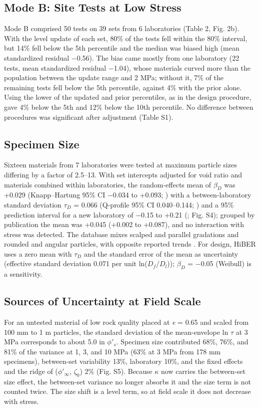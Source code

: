 \documentclass[Journal,letterpaper]{ascelike-new}
\begin{document}
\subsection{Mode B: Site Tests at Low Stress}
Mode B comprised 50 tests on 39 sets from 6 laboratories (Table 2, Fig. 2b). With the level update of each set, 80\% of the tests fell within the 80\% interval, but 14\% fell below the 5th percentile and the median was biased high (mean standardized residual $-$0.56). The bias came mostly from one laboratory (22 tests, mean standardized residual $-$1.04), whose materials curved more than the population between the update range and 2 MPa; without it, 7\% of the remaining tests fell below the 5th percentile, against 4\% with the prior alone. Using the lower of the updated and prior percentiles, as in the design procedure, gave 4\% below the 5th and 12\% below the 10th percentile. No difference between procedures was significant after adjustment (Table S1).

\subsection{Specimen Size}
Sixteen materials from 7 laboratories were tested at maximum particle sizes differing by a factor of 2.5--13. With set intercepts adjusted for void ratio and materials combined within laboratories, the random-effects mean of $\beta_D$ was +0.029 (Knapp--Hartung 95\% CI $-$0.034 to +0.093; ) with a between-laboratory standard deviation $\tau_D$ = 0.066 (Q-profile 95\% CI 0.040--0.144; ) and a 95\% prediction interval for a new laboratory of $-$0.15 to +0.21 (; Fig. S4); grouped by publication the mean was +0.045 (+0.002 to +0.087), and no interaction with stress was detected. The database mixes scalped and parallel gradations and rounded and angular particles, with opposite reported trends \cite{varadarajan2003,ovalle2020b}. For design, HiBER uses a zero mean with $\tau_D$ and the standard error of the mean as uncertainty (effective standard deviation 0.071 per unit ln($D_f$/$D_l$)); $\beta_D$ = $-$0.05 (Weibull) is a sensitivity.

\subsection{Sources of Uncertainty at Field Scale}
For an untested material of low rock quality placed at \textit{e} = 0.65 and scaled from 100 mm to 1 m particles, the standard deviation of the mean-envelope ln $\tau$ at 3 MPa corresponds to about 5.0\textdegree{} in $\phi'_s$. Specimen size contributed 68\%, 76\%, and 81\% of the variance at 1, 3, and 10 MPa (63\% at 3 MPa from 178 mm specimens), between-set variability 13\%, laboratory 10\%, and the fixed effects and the ridge of ($\phi'_\infty$, $\zeta_0$) 2\% (Fig. S5). Because $\kappa$ now carries the between-set size effect, the between-set variance no longer absorbs it and the size term is not counted twice. The size shift is a level term, so at field scale it does not decrease with stress.
\end{document}
